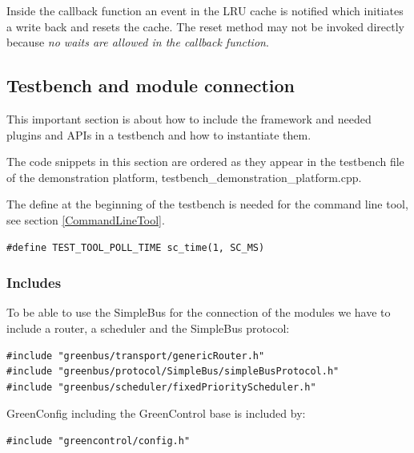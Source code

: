 Inside the callback function an event in the LRU cache is notified which initiates a write back and resets the cache. The reset method may not be invoked directly because \emph{no waits are allowed in the callback function}.


\subsection{Testbench and module connection}

This important section is about how to include the framework and needed plugins and APIs in a testbench and how to instantiate them.

The code snippets in this section are ordered as they appear in the testbench file of the demonstration platform, testbench\_demonstration\_platform.cpp.

The define at the beginning of the testbench is needed for the command line tool, see section \ref{CommandLineTool}.
\begin{lstlisting}
#define TEST_TOOL_POLL_TIME sc_time(1, SC_MS)
\end{lstlisting}

\subsubsection{Includes}

To be able to use the SimpleBus for the connection of the modules we have to include a router, a scheduler and the SimpleBus protocol:
\begin{lstlisting}
#include "greenbus/transport/genericRouter.h"
#include "greenbus/protocol/SimpleBus/simpleBusProtocol.h"
#include "greenbus/scheduler/fixedPriorityScheduler.h"
\end{lstlisting}



GreenConfig including the GreenControl base is included by:
\begin{lstlisting}
#include "greencontrol/config.h"
\end{lstlisting}

